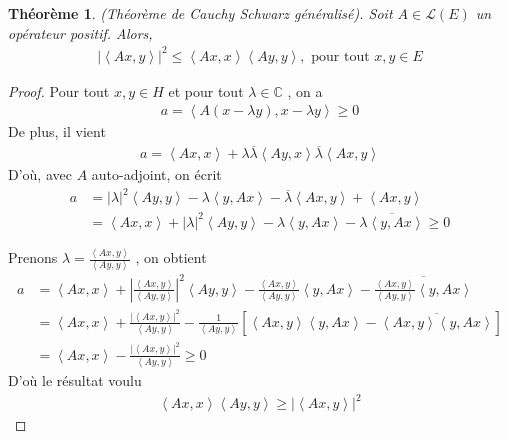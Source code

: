 \documentclass{report}
\newtheorem{The}{Théorème}[subsection]
\begin{document}
{\begin{The}(Théorème de Cauchy Schwarz généralisé). Soit $A \in \mathscr{L}(E)$ un opérateur positif. Alors, 
					\begin{align*}
					 |\left< Ax,y \right>|^2 \le \left< Ax,x \right> \left< Ay,y \right> , \,\,\text{pour tout}\,\, x,y \in E 
					\end{align*}
\end{The}
\begin{proof}
Pour tout $x,y \in H$ et pour tout $\lambda \in \mathbb{C}$ , on a 
					\begin{align*}
					 a = \left< A(x-\lambda y),x-\lambda y \right> \ge 0 
					\end{align*}
De plus, il vient 
					\begin{align*}
					 a = \left< Ax,x \right> + \lambda \overline{\lambda}\left< Ay,x \right> \overline{\lambda}\left< Ax,y \right> 
					\end{align*}
D'où, avec $A$ auto-adjoint, on écrit 
					\begin{align*}
					 a &= |\lambda|^2 \left< Ay,y \right> - \lambda \left< y,Ax \right> - \overline{\lambda} \left< Ax,y \right> + \left< Ax,y \right> \\
					 &= \left< Ax,x \right> + |\lambda|^2\left< Ay,y \right> - \lambda \left< y,Ax \right> - \overline{\lambda \left< y,Ax \right>} \ge 0 
					\end{align*}



Prenons $\lambda = \frac{\left< Ax,y \right>}{\left< Ay,y \right>}$ , on obtient 
					\begin{align*}
					 a &= \left< Ax,x \right> + |\frac{\left< Ax,y \right>}{\left< Ay,y \right>}|^2 \left< Ay,y \right> - \frac{\left< Ax,y \right>}{\left< Ay,y \right>}\left< y,Ax \right> - \overline{\frac{\left< Ax,y \right>}{\left< Ay,y \right>} \left< y,Ax \right>} \\
					 &= \left< Ax,x \right> + \frac{|\left< Ax,y \right>|^2}{\left< Ay,y \right>} - \frac{1}{\left< Ay,y \right>} [ \left< Ax,y \right>\left< y,Ax \right> - \overline{\left< Ax,y \right> \left< y,Ax \right>} ] \\
					 &= \left< Ax,x \right> - \frac{|\left< Ax,y \right>|^2}{\left< Ay,y \right>} \ge 0
					\end{align*}
D'où le résultat voulu 
					\begin{align*}
					 \left< Ax,x \right> \left< Ay,y \right> \ge |\left< Ax,y \right>|^2  
					\end{align*}
\end{proof}



}
\end{document}
